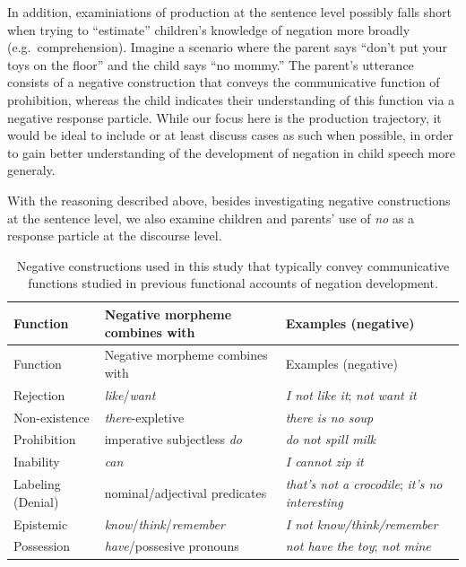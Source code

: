 \documentclass[
  english,
  man,floatsintext]{apa6}
\begin{document}
In addition, examiniations of production at the sentence level possibly falls short when trying to ``estimate'' children's knowledge of negation more broadly (e.g.~comprehension). Imagine a scenario where the parent says ``don't put your toys on the floor'' and the child says ``no mommy.'' The parent's utterance consists of a negative construction that conveys the communicative function of prohibition, whereas the child indicates their understanding of this function via a negative response particle. While our focus here is the production trajectory, it would be ideal to include or at least discuss cases as such when possible, in order to gain better understanding of the development of negation in child speech more generaly.

With the reasoning described above, besides investigating negative constructions at the sentence level, we also examine children and parents' use of \emph{no} as a response particle at the discourse level.

\begin{longtable}[]{@{}
  >{\raggedright\arraybackslash}p{}
  >{\raggedright\arraybackslash}p{}
  >{\raggedright\arraybackslash}p{}@{}}
\caption{\label{tab:constructions} Negative constructions used in this study that typically convey communicative functions studied in previous functional accounts of negation development.}\tabularnewline
\toprule
Function & Negative morpheme combines with & Examples (negative) \\
\midrule
\endfirsthead
\toprule
Function & Negative morpheme combines with & Examples (negative) \\
\midrule
\endhead
Rejection & \emph{like}/\emph{want} & \emph{I not like it}; \emph{not want it} \\
Non-existence & \emph{there}-expletive & \emph{there is no soup} \\
Prohibition & imperative subjectless \emph{do} & \emph{do not spill milk} \\
Inability & \emph{can} & \emph{I cannot zip it} \\
Labeling (Denial) & nominal/adjectival predicates & \emph{that's not a crocodile}; \emph{it's no interesting} \\
Epistemic & \emph{know}/\emph{think}/\emph{remember} & \emph{I not know/think/remember} \\
Possession & \emph{have}/possesive pronouns & \emph{not have the toy}; \emph{not mine} \\
\bottomrule
\end{longtable}
\end{document}
